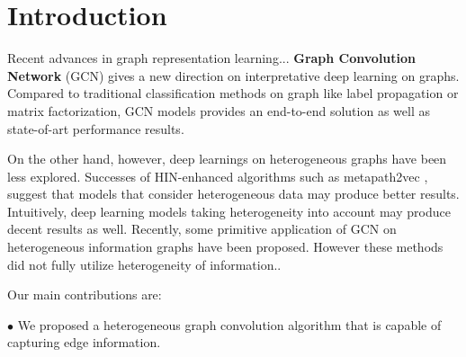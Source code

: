 \section{Introduction}
\label{sec:intro}
Recent advances in graph representation learning... \textbf{Graph Convolution Network} (GCN) gives a new direction on interpretative deep learning on graphs. Compared to traditional classification methods on graph like label propagation or matrix factorization, GCN models provides an end-to-end solution as well as state-of-art performance results.

On the other hand, however, deep learnings on heterogeneous graphs have been less explored. Successes of HIN-enhanced algorithms such as metapath2vec \cite{DongCS17},  suggest that models that consider heterogeneous data may produce better results. Intuitively, deep learning models taking heterogeneity into account may produce decent results as well.
Recently, some primitive application of GCN on heterogeneous information graphs have been proposed. However these methods did not fully utilize heterogeneity of information..



Our main contributions are:

\noindent$\bullet$
We proposed a heterogeneous graph convolution algorithm that is capable of capturing edge information.

